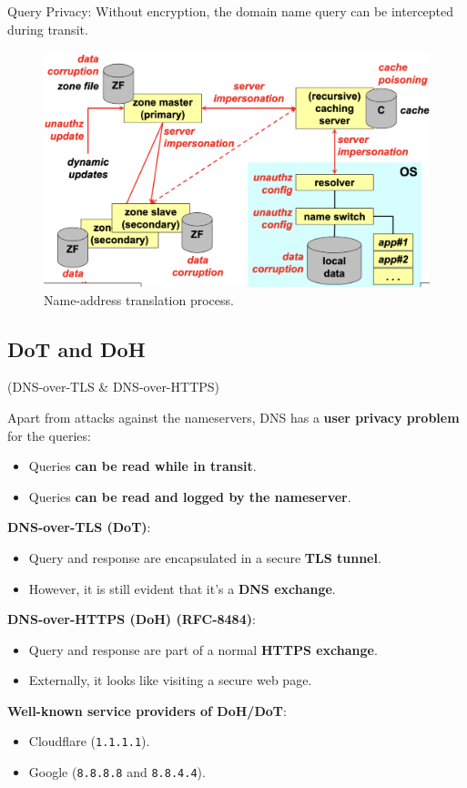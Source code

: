 \begin{tcolorbox}[colback=red!10!white, colframe=red!70!black, coltitle=white, title=Beware]
    Query Privacy: Without encryption, the domain name query can be intercepted during transit.
\end{tcolorbox}
\begin{figure}[H]
  \includegraphics[width=\linewidth]{Images/NetSec/name_address_translation.png}
  \caption{Name-address translation process.}
  \label{fig:name_address_trans}
\end{figure}


\subsection{DoT and DoH}
\begin{center}
    (DNS-over-TLS \& DNS-over-HTTPS)
\end{center}

Apart from attacks against the nameservers, DNS has a \textbf{user privacy problem} for the queries:
\begin{itemize}
    \item Queries \textbf{can be read while in transit}.
    \item Queries \textbf{can be read and logged by the nameserver}.
\end{itemize}

\textbf{DNS-over-TLS (DoT)}:
\begin{itemize}
    \item Query and response are encapsulated in a secure \textbf{TLS tunnel}.
    \item However, it is still evident that it's a \textbf{DNS exchange}.
\end{itemize}

\textbf{DNS-over-HTTPS (DoH) (RFC-8484)}:
\begin{itemize}
    \item Query and response are part of a normal \textbf{HTTPS exchange}.
    \item Externally, it looks like visiting a secure web page.
\end{itemize}

\textbf{Well-known service providers of DoH/DoT}:
\begin{itemize}
    \item Cloudflare (\texttt{1.1.1.1}).
    \item Google (\texttt{8.8.8.8} and \texttt{8.8.4.4}).
\end{itemize}